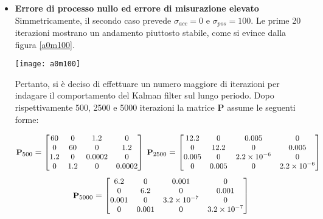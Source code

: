 \begin{itemize}
\item \textbf{Errore di processo nullo ed errore di misurazione elevato}\\
Simmetricamente, il secondo caso prevede $\sigma_{acc} = 0$ e $\sigma_{pos} = 100$. Le prime 20 iterazioni mostrano un andamento piuttosto stabile, come si evince dalla figura \ref{a0m100}.

\begin{minipage}{\linewidth}
	\centering
	\texttt{[image: a0m100]}
	\label{a0m100}
\end{minipage}

Pertanto, si è deciso di effettuare un numero maggiore di iterazioni per indagare il comportamento del Kalman filter sul lungo periodo. Dopo rispettivamente 500, 2500 e 5000 iterazioni la matrice \textbf{P} assume le seguenti forme: 

\begin{equation*}
\small
\textbf{P}_{500}= 
\begin{bmatrix}
60 & 0 & 1.2 & 0 \\
0 & 60 & 0 & 1.2 \\
1.2 & 0 & 0.0002 & 0 \\
0 & 1.2 & 0 &  0.0002 \\
\end{bmatrix}
\;
\textbf{P}_{2500} = 
\begin{bmatrix}
12.2 & 0 & 0.005 & 0 \\
0 & 12.2 & 0 & 0.005 \\
0.005 & 0 & 2.2 \times 10^{-6} & 0 \\
0 & 0.005 & 0 &  2.2\times 10^{-6} \\
\end{bmatrix}
\end{equation*}
\begin{equation*}
\small
\textbf{P}_{5000} = 
\begin{bmatrix}
6.2 & 0 & 0.001 & 0 \\
0 & 6.2 & 0 & 0.001 \\
0.001 & 0 & 3.2\times 10^{-7} & 0 \\
0 & 0.001 & 0 &  3.2\times 10^{-7} \\
\end{bmatrix}
\end{equation*}


\end{itemize}
